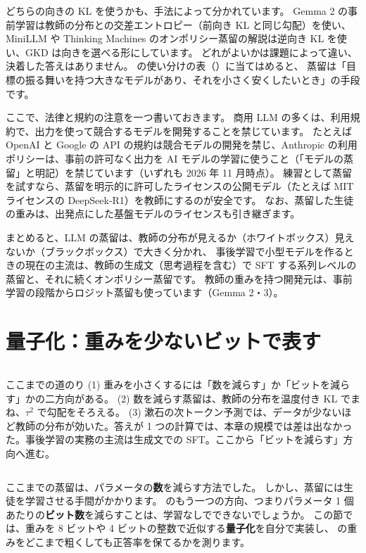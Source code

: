 どちらの向きの KL を使うかも、手法によって分かれています。
Gemma 2 の事前学習は教師の分布との交差エントロピー（前向き KL と同じ勾配）を使い、MiniLLM や Thinking Machines のオンポリシー蒸留の解説は逆向き KL を使い、GKD は向きを選べる形にしています\cite{gu2024minillm,agarwal2024gkd}。
どれがよいかは課題によって違い、決着した答えはありません。
の使い分けの表（）に当てはめると、
蒸留は「目標の振る舞いを持つ大きなモデルがあり、それを小さく安くしたいとき」の手段です。

ここで、法律と規約の注意を一つ書いておきます。
商用 LLM の多くは、利用規約で、出力を使って競合するモデルを開発することを禁じています。
たとえば OpenAI と Google の API の規約は競合モデルの開発を禁じ、Anthropic の利用ポリシーは、事前の許可なく出力を AI モデルの学習に使うこと（「モデルの蒸留」と明記）を禁じています（いずれも 2026 年 11 月時点）。
練習として蒸留を試すなら、蒸留を明示的に許可したライセンスの公開モデル（たとえば MIT ライセンスの DeepSeek-R1）を教師にするのが安全です。
なお、蒸留した生徒の重みは、出発点にした基盤モデルのライセンスも引き継ぎます。

まとめると、LLM の蒸留は、教師の分布が見えるか（ホワイトボックス）見えないか（ブラックボックス）で大きく分かれ、
事後学習で小型モデルを作るときの現在の主流は、教師の生成文（思考過程を含む）で SFT する系列レベルの蒸留と、それに続くオンポリシー蒸留です。
教師の重みを持つ開発元は、事前学習の段階からロジット蒸留も使っています（Gemma 2・3）。

\section{量子化：重みを少ないビットで表す}\label{sec:distill-quant}

\begin{column}{ここまでの道のり}
(1) 重みを小さくするには「数を減らす」か「ビットを減らす」かの二方向がある。
(2) 数を減らす蒸留は、教師の分布を温度付き KL でまね、$\tau^2$ で勾配をそろえる。
(3) 漱石の次トークン予測では、データが少ないほど教師の分布が効いた。答えが 1 つの計算では、本章の規模では差は出なかった。事後学習の実務の主流は生成文での SFT。ここから「ビットを減らす」方向へ進む。
\end{column}

ここまでの蒸留は、パラメータの\textbf{数}を減らす方法でした。
しかし、蒸留には生徒を学習させる手間がかかります。
のもう一つの方向、つまりパラメータ 1 個あたりの\textbf{ビット数}を減らすことは、学習なしでできないでしょうか。
この節では、重みを 8 ビットや 4 ビットの整数で近似する\textbf{量子化}を自分で実装し、 の重みをどこまで粗くしても正答率を保てるかを測ります。

